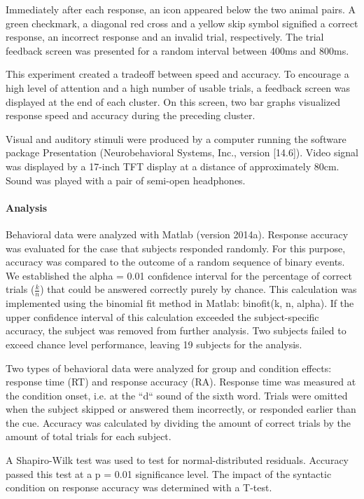 Immediately after each response, an icon appeared below the two animal pairs.
A green checkmark, a diagonal red cross and a yellow skip symbol signified a correct response, an incorrect response and an invalid trial, respectively.
The trial feedback screen was presented for a random interval between 400ms and 800ms.

This experiment created a tradeoff between speed and accuracy.
To encourage a high level of attention and a high number of usable trials, a feedback screen was displayed at the end of each cluster.
On this screen, two bar graphs visualized response speed and accuracy during the preceding cluster.

Visual and auditory stimuli were produced by a computer running the software package Presentation (Neurobehavioral Systems, Inc., version [14.6]).
Video signal was displayed by a 17-inch TFT display at a distance of approximately 80cm.
Sound was played with a pair of semi-open headphones.


\paragraph{Analysis}

Behavioral data were analyzed with Matlab (version 2014a).
Response accuracy was evaluated for the case that subjects responded randomly.
For this purpose, accuracy was compared to the outcome of a random sequence of binary events.
We established the alpha = 0.01 confidence interval for the percentage of correct trials ($\frac{k}{n}$) that could be answered correctly purely by chance.
This calculation was implemented using the binomial fit method in Matlab: binofit(k, n, alpha).
If the upper confidence interval of this calculation exceeded the subject-specific accuracy, the subject was removed from further analysis.
Two subjects failed to exceed chance level performance, leaving 19 subjects for the analysis.

Two types of behavioral data were analyzed for group and condition effects: response time (RT) and response accuracy (RA).
Response time was measured at the condition onset, i.e. at the ``d`` sound of the sixth word.
Trials were omitted when the subject skipped or answered them incorrectly, or responded earlier than the cue.
Accuracy was calculated by dividing the amount of correct trials by the amount of total trials for each subject.

A Shapiro-Wilk test was used to test for normal-distributed residuals.
Accuracy passed this test at a p = 0.01 significance level.
The impact of the syntactic condition on response accuracy was determined with a T-test.

